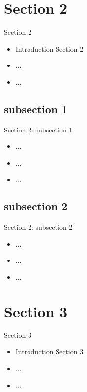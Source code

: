 \documentclass{beamer}
\begin{document}
\section{Section 2}
\begin{frame}{Section 2}
\begin{itemize}
	\item Introduction Section 2
	\item ...
	\item ...
\end{itemize}
\end{frame}
\subsection{subsection 1}
\begin{frame}{Section 2: subsection 1}
\begin{itemize}
	\item ...
	\item ...
	\item ...
\end{itemize}
\end{frame}
\subsection{subsection 2}
\begin{frame}{Section 2: subsection 2}
\begin{itemize}
	\item ...
	\item ...
	\item ...
\end{itemize}
\end{frame}
\section{Section 3}
\begin{frame}{Section 3}
\begin{itemize}
	\item Introduction Section 3
	\item ...
	\item ...
\end{itemize}
\end{frame}
\end{document}
